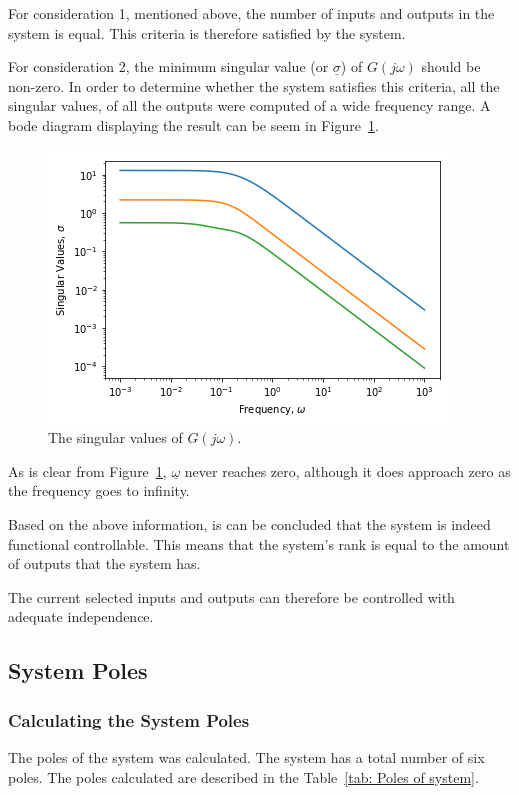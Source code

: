 For consideration 1, mentioned above, the number of inputs and outputs in the system is equal. This criteria is therefore satisfied by the system.

For consideration 2, the minimum singular value (or $\underline{\sigma}$) of $G(j\omega)$ should be non-zero. In order to determine whether the system satisfies this criteria, all the singular values, of all the outputs were computed of a wide frequency range. A bode diagram displaying the result can be seem in Figure~\ref{fig:gs-singular-values}.

\begin{figure}
	\centering
	\includegraphics[width=0.7\linewidth]{"Figures/G(s) Singular Values"}
	\caption{The singular values of $G(j\omega)$.}
	\label{fig:gs-singular-values}
\end{figure}

As is clear from Figure~\ref{fig:gs-singular-values}, $\underline{\omega}$ never reaches zero, although it does approach zero as the frequency goes to infinity. 

Based on the above information, is can be concluded that the system is indeed functional controllable. This means that the system's rank is equal to the amount of outputs that the system has.

The current selected inputs and outputs can therefore be controlled with adequate independence.

\subsection{System Poles}

\subsubsection{Calculating the System Poles}

The poles of the system was calculated. The system has a total  number of six poles. The poles calculated are described in the Table~\ref{tab: Poles of system}.

